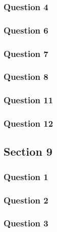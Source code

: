 \documentclass{article}
\begin{document}
\subsubsection{Question 4}
\subsubsection{Question 6}
\subsubsection{Question 7}
\subsubsection{Question 8}
\subsubsection{Question 11}
\subsubsection{Question 12}

\subsection{Section 9}
\subsubsection{Question 1}
\subsubsection{Question 2}
\subsubsection{Question 3}
\end{document}
